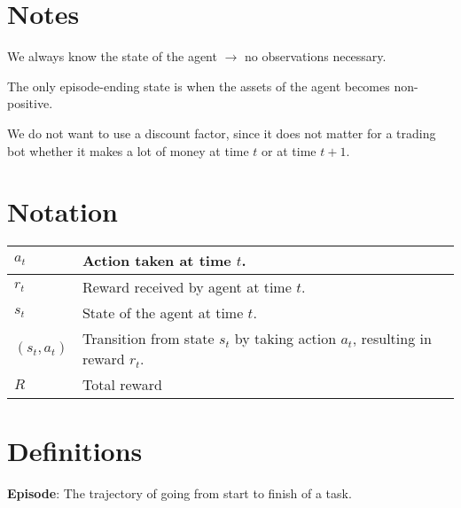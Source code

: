 \documentclass[12pt,letterpaper, onecolumn]{exam}
\newcommand{\highlight}[1]{\textbf{\textcolor{highlight_color}{#1}}}
\begin{document}
\section{Notes}
We always know the state of the agent $\rightarrow$ no observations necessary.

The only episode-ending state is when the assets of the agent becomes non-positive.

We do not want to use a discount factor, since it does not matter for a trading bot whether it makes a lot of money at time $t$ or at time $t+1$.



\newpage
\section{Notation}
\begin{center}
    \begin{tabular}{ | m{5em} | m{12cm}| } 
      \hline
      $a_t$ & Action taken at time $t$. \\ 
      \hline
      $r_t$ & Reward received by agent at time $t$. \\ 
      \hline
      $s_t$ & State of the agent at time $t$. \\
      \hline
      $(s_t, a_t)$ & Transition from state $s_t$ by taking action $a_t$, resulting in reward $r_t$. \\
      \hline
      $R$ & Total reward \\
      \hline
    \end{tabular}
    \end{center}

\section{Definitions}
\highlight{Episode}: The trajectory of going from start to finish of a task.




    
    
    
\end{document}
